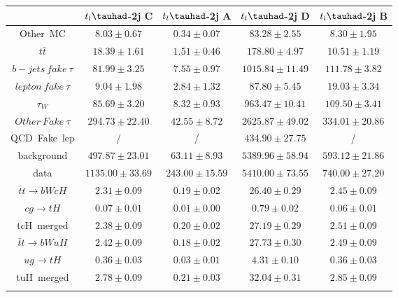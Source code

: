\centering
\begin{tabular}{ccccc} \toprule\toprule
 & $t_{l}\tauhad$-2j C & $t_{l}\tauhad$-2j A & $t_{l}\tauhad$-2j D & $t_{l}\tauhad$-2j B\\\midrule
Other~MC & $8.03\pm0.67$ & $0.34\pm0.07$ & $83.28\pm2.55$ & $8.30\pm1.95$\\
$t\bar{t}$ & $18.39\pm1.61$ & $1.51\pm0.46$ & $178.80\pm4.97$ & $10.51\pm1.19$\\
$b-jets~fake~\tau$ & $81.99\pm3.25$ & $7.55\pm0.97$ & $1015.84\pm11.49$ & $111.78\pm3.82$\\
$lepton~fake~\tau$ & $9.04\pm1.98$ & $2.84\pm1.32$ & $87.80\pm5.45$ & $19.03\pm3.34$\\
$\tau_{W}$ & $85.69\pm3.20$ & $8.32\pm0.93$ & $963.47\pm10.41$ & $109.50\pm3.41$\\
$Other~Fake~\tau$ & $294.73\pm22.40$ & $42.55\pm8.72$ & $2625.87\pm49.02$ & $334.01\pm20.86$\\
QCD~Fake~lep &  / &  / & $434.90\pm27.75$ &  /\\
background & $497.87\pm23.01$ & $63.11\pm8.93$ & $5389.96\pm58.94$ & $593.12\pm21.86$\\
data & $1135.00\pm33.69$ & $243.00\pm15.59$ & $5410.00\pm73.55$ & $740.00\pm27.20$\\
$\bar{t}t\to bWcH$ & $2.31\pm0.09$ & $0.19\pm0.02$ & $26.40\pm0.29$ & $2.45\pm0.09$\\
$cg\to tH$ & $0.07\pm0.01$ & $0.01\pm0.00$ & $0.79\pm0.02$ & $0.06\pm0.01$\\
tcH~merged & $2.38\pm0.09$ & $0.20\pm0.02$ & $27.19\pm0.29$ & $2.51\pm0.09$\\
$\bar{t}t\to bWuH$ & $2.42\pm0.09$ & $0.18\pm0.02$ & $27.73\pm0.30$ & $2.49\pm0.09$\\
$ug\to tH$ & $0.36\pm0.03$ & $0.03\pm0.01$ & $4.31\pm0.10$ & $0.36\pm0.03$\\
tuH~merged & $2.78\pm0.09$ & $0.21\pm0.03$ & $32.04\pm0.31$ & $2.85\pm0.09$\\
\bottomrule\bottomrule\\
\end{tabular}
